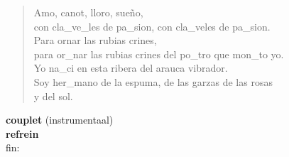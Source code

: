 \begin{verse}
Amo, canot, lloro, sue\~no,\\
con cla\_ve\_les de pa\_sion, con cla\_veles de pa\_sion.\\
Para ornar las rubias crines,\\
para or\_nar las rubias crines del po\_tro que mon\_to yo.\\
Yo na\_ci en esta ribera del arauca vibrador.\\
Soy her\_mano de la espuma, de las garzas de las rosas   \\
y del sol.\\
\end{verse}

\textbf{couplet} (instrumentaal)\\
\textbf{refrein}\\
fin:             
